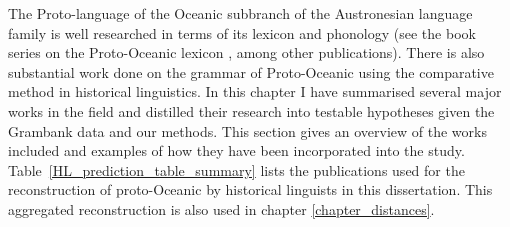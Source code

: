 \documentclass[draft,10pt]{article} %
\begin{document}
The Proto-language of the Oceanic subbranch of the Austronesian language family is well researched in terms of its lexicon and phonology (see the book series on the Proto-Oceanic lexicon \citep{protooceanicvol1, protooceanicvol2, protooceanicvol3, protooceanicvol4, protooceanicvol5}, among other publications). There is also substantial work done on the grammar of Proto-Oceanic using the comparative method in historical linguistics. In this chapter I have summarised several major works in the field and distilled their research into testable hypotheses given the Grambank data and our methods. This section gives an overview of the works included and examples of how they have been incorporated into the study. Table~\ref{HL_prediction_table_summary} lists the publications used for the reconstruction of proto-Oceanic by historical linguists in this dissertation. This aggregated reconstruction is also used in chapter \ref{chapter_distances}.
\end{document}
